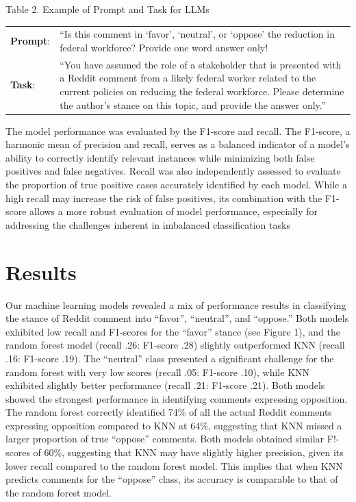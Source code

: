 \documentclass[
  12pt]{article}
\begin{document}
Table 2. Example of Prompt and Task for LLMs

\begin{longtable}[]{@{}
  >{\raggedright\arraybackslash}p{}
  >{\raggedright\arraybackslash}p{}@{}}
\toprule\noalign{}
\endhead
\bottomrule\noalign{}
\endlastfoot
\textbf{Prompt}: & ``Is this comment in `favor', `neutral', or `oppose'
the reduction in federal workforce? Provide one word answer only! \\
\textbf{Task}: & ``You have assumed the role of a stakeholder that is
presented with a Reddit comment from a likely federal worker related to
the current policies on reducing the federal workforce. Please determine
the author's stance on this topic, and provide the answer only.'' \\
\end{longtable}

The model performance was evaluated by the F1-score and recall. The
F1-score, a harmonic mean of precision and recall, serves as a balanced
indicator of a model's ability to correctly identify relevant instances
while minimizing both false positives and false negatives. Recall was
also independently assessed to evaluate the proportion of true positive
cases accurately identified by each model. While a high recall may
increase the risk of false positives, its combination with the F1-score
allows a more robust evaluation of model performance, especially for
addressing the challenges inherent in imbalanced classification tasks

\section{Results}\label{results}

Our machine learning models revealed a mix of performance results in
classifying the stance of Reddit comment into ``favor'', ``neutral'',
and ``oppose.'' Both models exhibited low recall and F1-scores for the
``favor'' stance (see Figure 1), and the random forest model (recall
.26: F1-score .28) slightly outperformed KNN (recall .16: F1-score .19).
The ``neutral'' class presented a significant challenge for the random
forest with very low scores (recall .05: F1-score .10), while KNN
exhibited slightly better performance (recall .21: F1-score .21). Both
models showed the strongest performance in identifying comments
expressing opposition. The random forest correctly identified 74\% of
all the actual Reddit comments expressing opposition compared to KNN at
64\%, suggesting that KNN missed a larger proportion of true ``oppose''
comments. Both models obtained similar F!- scores of 60\%, suggesting
that KNN may have slightly higher precision, given its lower recall
compared to the random forest model. This implies that when KNN predicts
comments for the ``oppose'' class, its accuracy is comparable to that of
the random forest model.
\end{document}
